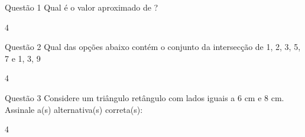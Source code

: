 {
\AMCquestionNumberfalse
\def\AMCbeginQuestion#1#2{}
\noindent

\begin{question}{Questão 1}
Qual é o valor aproximado de \pi?

\begin{multicols}{4}\columnseprule=0.1pt
\begin{choices}
\end{choices}
\end{multicols}
\end{question}
}

{
\AMCquestionNumberfalse
\def\AMCbeginQuestion#1#2{}
\noindent

\begin{question}{Questão 2}
Qual das opções abaixo contém o conjunto da intersecção de {1, 2, 3, 5, 7} e {1, 3, 9}

\begin{multicols}{4}\columnseprule=0.1pt
\begin{choices}
\end{choices}
\end{multicols}
\end{question}
}

{
\AMCquestionNumberfalse
\def\AMCbeginQuestion#1#2{}
\noindent

\begin{question}{Questão 3}
Considere um triângulo retângulo com lados iguais a 6 cm e 8 cm. Assinale a(s) alternativa(s) correta(s):

\begin{multicols}{4}\columnseprule=0.1pt
\begin{choices}
\end{choices}
\end{multicols}
\end{question}
}